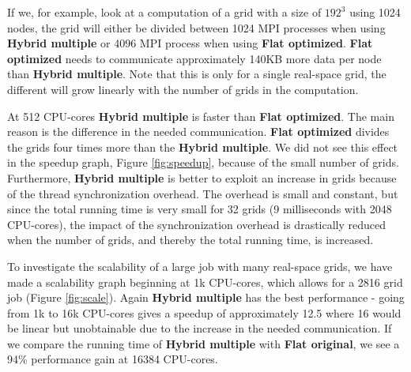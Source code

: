\documentclass[preprint,3p,times,twocolumn]{elsarticle}
\begin{document}
If we, for example, look at a computation of a grid with a size of $192^3$ using 1024 nodes, the grid will either be divided between 1024 MPI processes when using \textbf{Hybrid multiple} or 4096 MPI process when using \textbf{Flat optimized}. \textbf{Flat optimized} needs to communicate approximately 140KB more data per node than \textbf{Hybrid multiple}. Note that this is only for a single real-space grid, the different will grow linearly with the number of grids in the computation.

At 512 CPU-cores \textbf{Hybrid multiple} is faster than \textbf{Flat optimized}. The main reason is the difference in the needed communication. \textbf{Flat optimized} divides the grids four times more than the \textbf{Hybrid multiple}. We did not see this effect in the speedup graph, Figure \ref{fig:speedup}, because of the small number of grids. Furthermore, \textbf{Hybrid multiple} is better to exploit an increase in grids because of the thread synchronization overhead. The overhead is small and constant, but since the total running time is very small for 32 grids (9 milliseconds with 2048 CPU-cores), the impact of the synchronization overhead is drastically reduced when the number of grids, and thereby the total running time, is increased.

To investigate the scalability of a large job with many real-space grids, we have made a scalability graph beginning at 1k CPU-cores, which allows for a 2816 grid job (Figure \ref{fig:scale}). Again \textbf{Hybrid multiple} has the best performance - going from 1k to 16k CPU-cores gives a speedup of approximately 12.5 where 16 would be linear but unobtainable due to the increase in the needed communication. If we compare the running time of \textbf{Hybrid multiple} with \textbf{Flat original}, we see a 94\% performance gain at 16384 CPU-cores.

\end{document}
